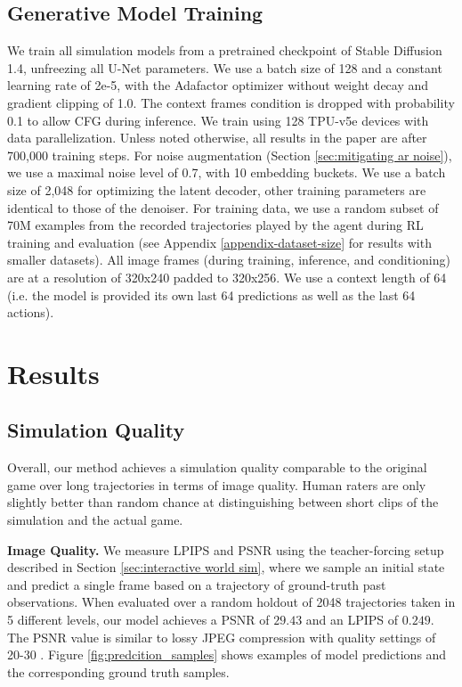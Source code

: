 \documentclass{article} %
\begin{document}
\subsection{Generative Model Training}
We train all simulation models from a pretrained checkpoint of Stable Diffusion 1.4, unfreezing all U-Net parameters. We use a batch size of 128 and a constant learning rate of 2e-5, with the Adafactor optimizer without weight decay \citep{Shazeer2018adafactor} and gradient clipping of 1.0. The context frames condition is dropped with probability 0.1 to allow CFG during inference. We train using 128 TPU-v5e devices with data parallelization. Unless noted otherwise, all results in the paper are after 700,000 training steps.
For noise augmentation (Section \ref{sec:mitigating ar noise}), we use a maximal noise level of 0.7, with 10 embedding buckets.
We use a batch size of 2,048 for optimizing the latent decoder, other training parameters are identical to those of the denoiser.
For training data, we use a random subset of 70M examples from the recorded trajectories played by the agent during RL training and evaluation (see Appendix \ref{appendix-dataset-size} for results with smaller datasets). All image frames (during training, inference, and conditioning) are at a resolution of 320x240 padded to 320x256. We use a context length of 64 (i.e. the model is provided its own last 64 predictions as well as the last 64 actions).

\section{Results}
\label{sec:results}

\subsection{Simulation Quality}
\label{sec:sim quality}

Overall, our method achieves a simulation quality comparable to the original game over long trajectories in terms of image quality. Human raters are only slightly better than random chance at distinguishing between short clips of the simulation and the actual game.

\textbf{Image Quality.} We measure LPIPS \citep{zhang2018perceptual} and PSNR using the teacher-forcing setup described in Section \ref{sec:interactive world sim}, where we sample an initial state and predict a single frame based on a trajectory of ground-truth past observations.
When evaluated over a random holdout of 2048 trajectories taken in 5 different levels, our model achieves a PSNR of $29.43$ and an LPIPS of $0.249$. %
The PSNR value is similar to lossy JPEG compression with quality settings of 20-30 \citep{petric2018comparisoncsjpegterms}.
Figure \ref{fig:predcition_samples} shows examples of model predictions and the corresponding ground truth samples.
\end{document}
